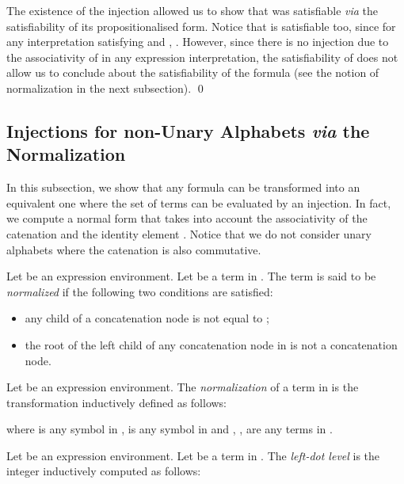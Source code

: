\documentclass[a4paper]{llncs}
\begin{document}
\begin{example}
        The existence of the injection allowed us to show that  was satisfiable \emph{via} the satisfiability of its propositionalised form. Notice that  is satisfiable too, since for any interpretation  satisfying  and , . However, since there is no injection due to the associativity of  in any expression interpretation, the satisfiability of  does not allow us to conclude about the satisfiability of the formula  (see the notion of normalization in the next subsection).  
  \qed
  \end{example}
  

  
  \subsection{Injections for non-Unary Alphabets \emph{via} the Normalization}\label{ssec normalization alph non unaire}
  
  In this subsection, we show that any formula can be transformed into an equivalent one where the set of terms can be evaluated by an injection. In fact, we compute a normal form that takes into account the associativity of the catenation and the identity element . Notice that we do not consider unary alphabets where the catenation is also commutative.
  
  \begin{definition}
    Let  be an expression environment. Let  be a term in . The term  is said to be \emph{normalized} if the  following two conditions are satisfied:
    \begin{itemize}
      \item any child of a concatenation node is not equal to ;
      \item the root of the left child of any concatenation node in  is not a concatenation node. 
    \end{itemize}
  \end{definition}   
  
  \begin{definition}[Normalization]
    Let  be an expression environment. The \emph{normalization} of a term  in  is the transformation  inductively defined as follows:
        
        where  is any symbol in ,  is any symbol in  and , ,  are any  terms in .   
  \end{definition}
  
  \begin{definition}
    Let  be an expression environment. Let  be a term in . The \emph{left-dot level}  is the integer inductively computed as follows: 
        
  \end{definition}
  
\end{document}
